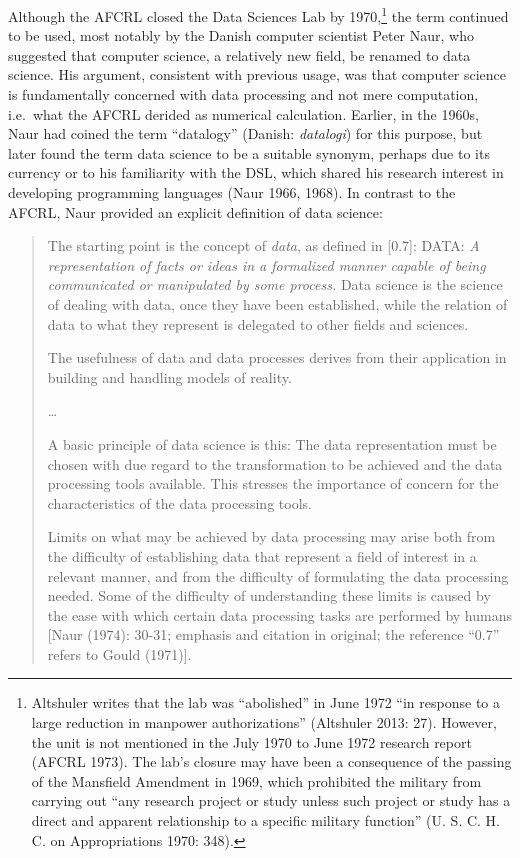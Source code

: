 \documentclass[
  letterpaper,
]{report}
\begin{document}
Although the AFCRL closed the Data Sciences Lab by 1970,\footnote{Altshuler
  writes that the lab was ``abolished'' in June 1972 ``in response to a
  large reduction in manpower authorizations'' (Altshuler 2013: 27).
  However, the unit is not mentioned in the July 1970 to June 1972
  research report (AFCRL 1973). The lab's closure may have been a
  consequence of the passing of the Mansfield Amendment in 1969, which
  prohibited the military from carrying out ``any research project or
  study unless such project or study has a direct and apparent
  relationship to a specific military function'' (U. S. C. H. C. on
  Appropriations 1970: 348).} the term continued to be used, most
notably by the Danish computer scientist Peter Naur, who suggested that
computer science, a relatively new field, be renamed to data science.
His argument, consistent with previous usage, was that computer science
is fundamentally concerned with data processing and not mere
computation, i.e.~what the AFCRL derided as numerical calculation.
Earlier, in the 1960s, Naur had coined the term ``datalogy'' (Danish:
\emph{datalogi}) for this purpose, but later found the term data science
to be a suitable synonym, perhaps due to its currency or to his
familiarity with the DSL, which shared his research interest in
developing programming languages (Naur 1966, 1968). In contrast to the
AFCRL, Naur provided an explicit definition of data science:

\begin{quote}
The starting point is the concept of \emph{data}, as defined in
{[}0.7{]}: DATA: \emph{A representation of facts or ideas in a
formalized manner capable of being communicated or manipulated by some
process.} Data science is the science of dealing with data, once they
have been established, while the relation of data to what they represent
is delegated to other fields and sciences.

The usefulness of data and data processes derives from their application
in building and handling models of reality.

\ldots{}

A basic principle of data science is this: The data representation must
be chosen with due regard to the transformation to be achieved and the
data processing tools available. This stresses the importance of concern
for the characteristics of the data processing tools.

Limits on what may be achieved by data processing may arise both from
the difficulty of establishing data that represent a field of interest
in a relevant manner, and from the difficulty of formulating the data
processing needed. Some of the difficulty of understanding these limits
is caused by the ease with which certain data processing tasks are
performed by humans {[}Naur (1974): 30-31; emphasis and citation in
original; the reference ``0.7'' refers to Gould (1971){]}.
\end{quote}
\end{document}
